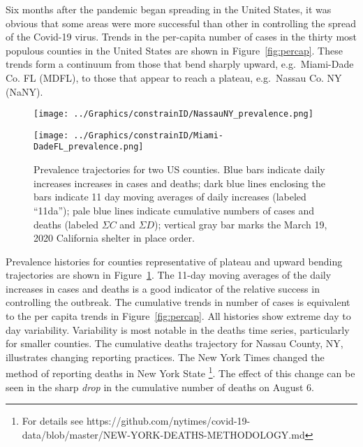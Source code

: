 \documentclass[12pt,letterpaper]{article}
\newcommand\EG{e.g.\ }
\begin{document}

Six months after the pandemic began spreading in the United States, it
was obvious that some areas were more successful than other
in controlling the spread of the Covid-19 virus.
Trends in the per-capita number of cases in the thirty most populous 
counties in the United States are shown in Figure~\ref{fig:percap}.
These trends form a continuum from those that bend sharply upward,
\EG Miami-Dade Co. FL (MDFL),  to
those that appear to reach a plateau, \EG Nassau Co. NY (NaNY). 


\begin{figure}
{\scriptsize
\begin{center}
\texttt{[image: ../Graphics/constrainID/NassauNY\_prevalence.png]}
 
\vspace{0.5truein}

\texttt{[image: ../Graphics/constrainID/Miami-DadeFL\_prevalence.png]}
\end{center}
}
\caption{\label{fig:prev}
Prevalence trajectories for two US counties.
Blue bars indicate daily increases increases in cases and deaths;
dark blue lines enclosing the bars indicate 11 day moving averages of
daily increases (labeled ``11da'');
pale blue lines indicate cumulative numbers of cases and deaths
(labeled $\Sigma C$ and $\Sigma D$); 
vertical gray bar marks the March 19, 2020 California shelter in place order.
}
\end{figure}

Prevalence histories for counties representative of plateau
and upward bending trajectories are shown in
Figure~\ref{fig:prev}. The 11-day moving averages of the daily
increases in cases and deaths is a good indicator of the
relative success in controlling the outbreak.
The cumulative trends in number of cases is equivalent to 
the per capita trends in Figure~\ref{fig:percap}.
All histories show extreme day to day variability.
Variability is most notable in the deaths
time series, particularly for smaller counties.
The cumulative deaths trajectory for Nassau County, NY, illustrates
changing reporting practices. The New York Times changed the method of
reporting deaths in New York State 
\footnote{For details see
https://github.com/nytimes/covid-19-data/blob/master/NEW-YORK-DEATHS-METHODOLOGY.md}.
The effect of this change can be seen in the sharp {\itshape drop} in
the cumulative number of deaths on August 6.
\end{document}
